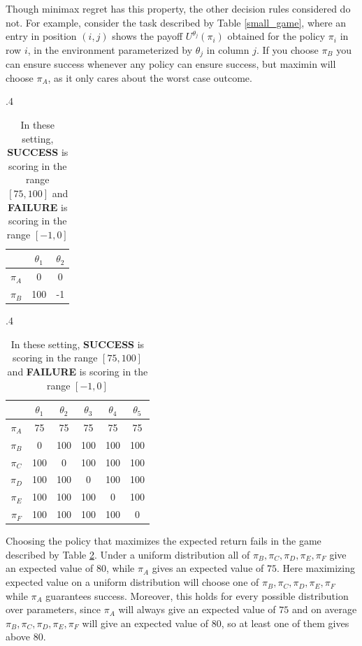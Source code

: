 \documentclass{article}
\begin{document}
\begin{appendix}
Though minimax regret has this property, the other decision rules considered do not.  For example, consider the task described by Table \ref{small_game}, where an entry in position $(i,j)$ shows the payoff $U^{\theta_j}(\pi_i)$ obtained for the policy $\pi_i$ in row $i$, in the environment parameterized by $\theta_j$ in column $j$. If you choose $\pi_B$ you can ensure success whenever any policy can ensure success, but maximin will choose $\pi_A$, as it only cares about the worst case outcome.
\begin{table}[h!]
\begin{subtable}{.4\linewidth}
\begin{center}
\begin{tabular}{ c | c  | c }
        & $\theta_1$ & $\theta_2$ \\
 \hline
 $\pi_A$ & 0 &  0 \\ 
  \hline
 $\pi_B$ & 100 & -1    
\end{tabular}
\caption{}
\label{small_game}
\end{center}
\end{subtable}%
\begin{subtable}{.4\linewidth}
\begin{center}
\begin{tabular}{ c | c  | c | c | c | c}
        & $\theta_1$ & $\theta_2$ & $\theta_3$ & $\theta_4$ & $\theta_5$  \\
 \hline
 $\pi_A$ & 75 &  75 & 75 &  75 & 75 \\ 
  \hline
 $\pi_B$ & 0 & 100 & 100 & 100 & 100  \\
 \hline
 $\pi_C$ & 100 & 0 & 100 & 100 & 100  \\
 \hline
 $\pi_D$ & 100 & 100 & 0 & 100 & 100  \\
 \hline
 $\pi_E$ & 100 & 100 & 100 & 0 & 100  \\
 \hline
 $\pi_F$ & 100 & 100 & 100 & 100 & 0  \\
\end{tabular}
\caption{}
\label{big_game}
\end{center}
\end{subtable}
\caption{In these setting, \textbf{SUCCESS} is scoring in the range $[75,100]$ and \textbf{FAILURE} is scoring in the range $[-1,0]$}
\end{table}

  Choosing the policy that maximizes the expected return fails in the game described by Table \ref{big_game}.  Under a uniform distribution all of $\pi_B,\pi_C,\pi_D,\pi_E,\pi_F$ give an expected value of $80$, while $\pi_A$ gives an expected value of $75$.  Here maximizing expected value on a uniform distribution will choose one of $\pi_B,\pi_C,\pi_D,\pi_E,\pi_F$ while $\pi_A$ guarantees success.  Moreover, this holds for every possible distribution over parameters, since $\pi_A$ will always give an expected value of $75$ and on average $\pi_B,\pi_C,\pi_D,\pi_E,\pi_F$ will give an expected value of $80$, so at least one of them gives above $80$.



\end{appendix}
\end{document}
